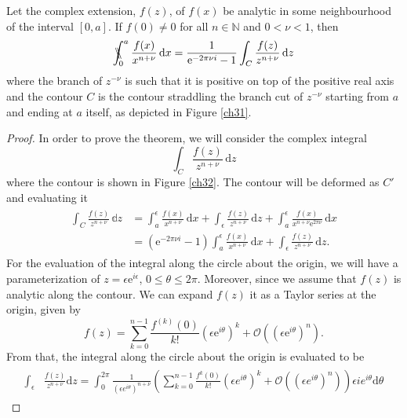 \begin{theorem}\label{T3.2}
Let the complex extension, $f(z)$, of $f(x)$ be analytic in some neighbourhood of the interval $[0, a]$. If $f(0) \neq 0$ for all $n \in \mathbb{N}$ and $0 < \nu < 1$, then 
\begin{equation}
    \bbint{0}{a} \frac{f(x)}{x^{n+\nu}} \, \mathrm{d}x = \frac{1}{\mathrm{e}^{-2 \pi \nu i}-1} \int_C \frac{f(z)}{z^{n+\nu}} \, \mathrm{d}z
\end{equation}
where the branch of $z^{-\nu}$ is such that it is positive on top of the positive real axis and the contour $C$ is the contour straddling the branch cut of $z^{-\nu}$ starting from $a$ and ending at $a$ itself, as depicted in Figure \ref{ch31}.
\end{theorem}
\begin{proof}
In order to prove the theorem, we will consider the complex integral
\begin{equation}
    \int_C \frac{f(z)}{z^{n+\nu}} \, \mathrm{d}z
\end{equation}
where the contour is shown in Figure \ref{ch32}. The contour will be deformed as $C'$ and evaluating it
\begin{align}
\begin{split}
    \int_C \frac{f(z)}{z^{n+\nu}} \, \mathbb{d}z & = \int_{a}^{\epsilon} \frac{f(x)}{x^{n+\nu}} \, \mathrm{d}x + \int_{\epsilon} \frac{f(z)}{z^{n+\nu}} \, \mathrm{d}z + \int_{a}^{\epsilon} \frac{f(x)}{x^{n+\nu} \mathrm{e}^{2 \pi \nu}} \, \mathrm{d}x \\& = (\mathrm{e}^{-2 \pi \nu i}-1) \int_{a}^{\epsilon} \frac{f(x)}{x^{n+\nu}} \, \mathrm{d}x + \int_{\epsilon} \frac{f(z)}{z^{n+\nu}} \, \mathrm{d}z.
    \label{3.36}
\end{split}
\end{align}
For the evaluation of the integral along the circle about the origin, we will have a parameterization of $z = \epsilon \mathrm{e}^{i \epsilon}$, $0 \leq \theta \leq 2 \pi$. Moreover, since we assume that $f(z)$ is analytic along the contour. We can expand $f(z)$ it as a Taylor series at the origin, given by
\begin{equation}
    f(z) = \sum_{k=0}^{n-1} \frac{f^{(k)}(0)}{k!}(\epsilon \mathrm{e}^{i \theta})^{k} + \mathcal{O}((\epsilon \mathrm{e}^{i \theta})^{n}).
\end{equation}
From that, the integral along the circle about the origin is evaluated to be
\begin{align}
\begin{split}
	\int_{\epsilon} & \frac{f(z)}{z^{n+\nu}}\mathrm{d}z = \int_{0}^{2\pi}\frac{1}{\left(\epsilon e^{i\theta}\right)^{n+\nu}}\left(\sum_{k=0}^{n-1}\frac{f^{k}(0)}{k!}\left(\epsilon e^{i\theta}\right)^{k}+\mathcal{O}\left(\left(\epsilon e^{i\theta}\right)^{n}\right)\right)\epsilon i e^{i\theta}\mathrm{d}\theta

\end{split}
\end{align}
\end{proof}
